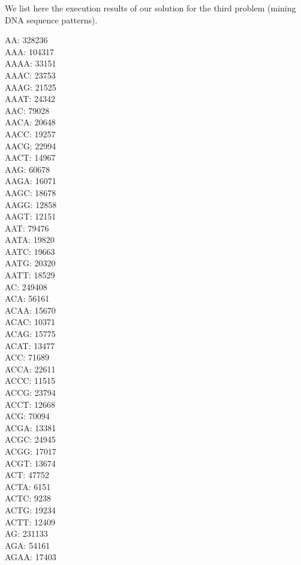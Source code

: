 We list here the execution results of our solution for the third problem (mining DNA sequence patterns).

\begin{multicols}{7}
  \noindent
  AA:	328236
\\ AAA:	104317
\\ AAAA:	33151
\\ AAAC:	23753
\\ AAAG:	21525
\\ AAAT:	24342
\\ AAC:	79028
\\ AACA:	20648
\\ AACC:	19257
\\ AACG:	22994
\\ AACT:	14967
\\ AAG:	60678
\\ AAGA:	16071
\\ AAGC:	18678
\\ AAGG:	12858
\\ AAGT:	12151
\\ AAT:	79476
\\ AATA:	19820
\\ AATC:	19663
\\ AATG:	20320
\\ AATT:	18529
\\ AC:	249408
\\ ACA:	56161
\\ ACAA:	15670
\\ ACAC:	10371
\\ ACAG:	15775
\\ ACAT:	13477
\\ ACC:	71689
\\ ACCA:	22611
\\ ACCC:	11515
\\ ACCG:	23794
\\ ACCT:	12668
\\ ACG:	70094
\\ ACGA:	13381
\\ ACGC:	24945
\\ ACGG:	17017
\\ ACGT:	13674
\\ ACT:	47752
\\ ACTA:	6151
\\ ACTC:	9238
\\ ACTG:	19234
\\ ACTT:	12409
\\ AG:	231133
\\ AGA:	54161
\\ AGAA:	17403

\end{multicols}
